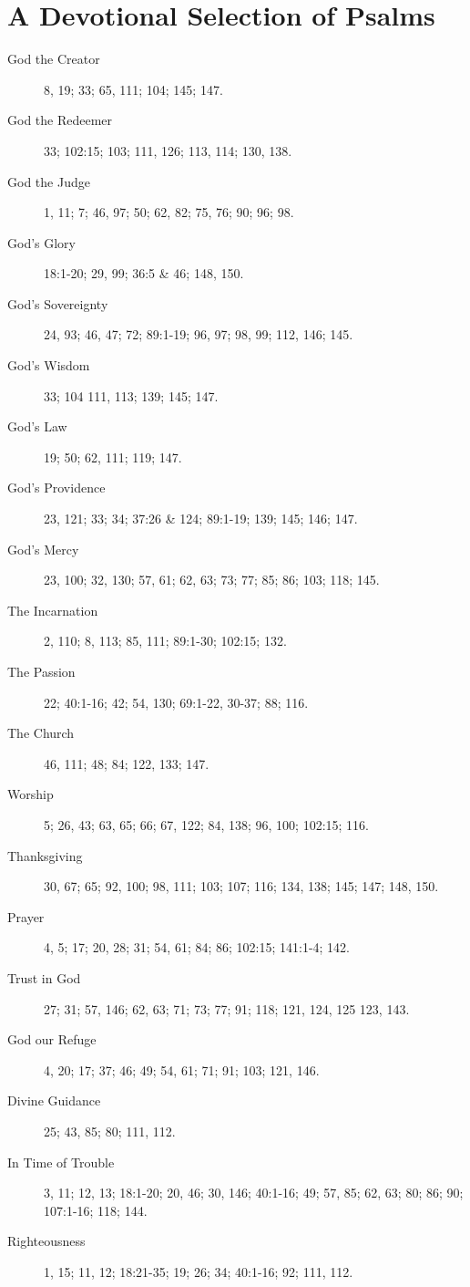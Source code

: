 \fancyhead[RE,LO]{}
\section{A Devotional Selection of Psalms}

\begin{description}
	\item[God the Creator] 8, 19; 33; 65, 111; 104; 145; 147.
	\item[God the Redeemer] 33; 102:15; 103; 111, 126; 113, 114; 130, 138.
	\item[God the Judge] 1, 11; 7; 46, 97; 50; 62, 82; 75, 76; 90; 96; 98.
	\item[God's Glory] 18:1-20; 29, 99; 36:5 \& 46; 148, 150.
	\item[God's Sovereignty] 24, 93; 46, 47; 72; 89:1-19; 96, 97; 98, 99; 112, 146; 145.
	\item[God's Wisdom] 33; 104 111, 113; 139; 145; 147.
	\item[God's Law] 19; 50; 62, 111; 119; 147.
	\item[God's Providence] 23, 121; 33; 34; 37:26 \& 124; 89:1-19; 139; 145; 146; 147.
	\item[God's Mercy] 23, 100; 32, 130; 57, 61; 62, 63; 73; 77; 85; 86; 103; 118; 145.
	\item[The Incarnation] 2, 110; 8, 113; 85, 111; 89:1-30; 102:15; 132.
	\item[The Passion] 22; 40:1-16; 42; 54, 130; 69:1-22, 30-37; 88; 116.
	\item[The Church] 46, 111; 48; 84; 122, 133; 147.
	\item[Worship] 5; 26, 43; 63, 65; 66; 67, 122; 84, 138; 96, 100; 102:15; 116.
	\item[Thanksgiving] 30, 67; 65; 92, 100; 98, 111; 103; 107; 116; 134, 138; 145; 147; 148, 150.
	\item[Prayer] 4, 5; 17; 20, 28; 31; 54, 61; 84; 86; 102:15; 141:1-4; 142.
	\item[Trust in God] 27; 31; 57, 146; 62, 63; 71; 73; 77; 91; 118; 121, 124, 125 123, 143.
	\item[God our Refuge] 4, 20; 17; 37; 46; 49; 54, 61; 71; 91; 103; 121, 146.
	\item[Divine Guidance] 25; 43, 85; 80; 111, 112.
	\item[In Time of Trouble] 3, 11; 12, 13; 18:1-20; 20, 46; 30, 146; 40:1-16; 49; 57, 85; 62, 63; 80; 86; 90; 107:1-16; 118; 144.
	\item[Righteousness] 1, 15; 11, 12; 18:21-35; 19; 26; 34; 40:1-16; 92; 111, 112.

\end{description}
